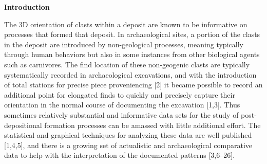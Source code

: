 \documentclass[]{article}
\begin{document}
\textbf{Introduction}

The 3D orientation of clasts within a deposit are known to be
informative on processes that formed that deposit. In archaeological
sites, a portion of the clasts in the deposit are introduced by
non-geological processes, meaning typically through human behaviors but
also in some instances from other biological agents such as carnivores.
The find location of these non-geogenic clasts are typically
systematically recorded in archaeological excavations, and with the
introduction of total stations for precise piece proveniencing {[}2{]}
it became possible to record an additional point for elongated finds to
quickly and precisely capture their orientation in the normal course of
documenting the excavation {[}1,3{]}. Thus sometimes relatively
substantial and informative data sets for the study of post-depositional
formation processes can be amassed with little additional effort. The
statistical and graphical techniques for analyzing these data are well
published {[}1,4,5{]}, and there is a growing set of actualistic and
archaeological comparative data to help with the interpretation of the
documented patterns {[}3,6--26{]}.
\end{document}
